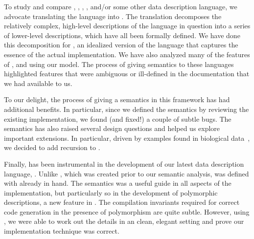 To study and compare \padsc{}, \padsml{}, \packettypes{},
\datascript{}, and/or some other data description language, we
advocate translating the language into \ddc{}.  The translation
decomposes the relatively complex, high-level descriptions of the
language in question into a series of lower-level \ddc{} descriptions,
which have all been formally defined.  We have done this decomposition
for \ipads{}, an idealized version of the \padsc{} language that
captures the essence of the actual implementation.  We have also
analyzed many of the features of \padsml{}, \packettypes{} and \datascript{}
using our model.  The process of giving semantics to these languages
highlighted features that were ambiguous or ill-defined in the
documentation that we had available to us.

To our delight, the process of giving \padsc{} 
a semantics in this framework has had additional benefits.  
In particular, since we defined the
semantics by reviewing the existing 
implementation, we found (and fixed!) a couple of subtle bugs.  
The semantics has also raised several
design questions and helped us explore important extensions.
In particular, driven by examples found in biological data~\cite{geneontology,newick-data}, we decided to add recursion to \padsc{}.

Finally, \ddc{} has been instrumental in the development of our
latest data description language,
\padsml{}.  Unlike \padsc, which was created prior to our semantic analysis,
\padsml{} was defined with \ddc{} already in hand.  The semantics
was a useful guide in all aspects of the \padsml{} implementation, but
particularly so in the development of polymorphic descriptions, a new
feature in \padsml{}.  The compilation invariants required for correct
code generation in the presence of polymorphism are quite subtle.  However,
using \ddc{}, we were able to work out the details in an clean, elegant
setting and prove our implementation technique was correct.

